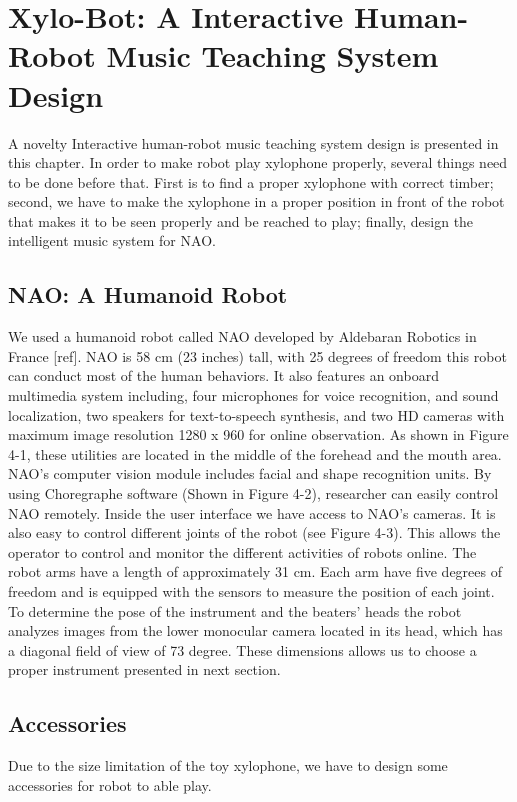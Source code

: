 \chapter{Xylo-Bot: A Interactive Human-Robot Music Teaching System Design} 
A novelty Interactive human-robot music teaching system design is presented in this chapter. In order to make robot play xylophone properly, several things need to be done before that. First is to find a proper xylophone with correct timber; second, we have to make the xylophone in a proper position in front of the robot that makes it to be seen properly and be reached to play; finally, design the intelligent music system for NAO. 

\section{NAO: A Humanoid Robot}
We used a humanoid  robot called NAO developed by Aldebaran Robotics in France [ref]. NAO is 58 cm (23 inches) tall, with 25 degrees of freedom this robot can conduct most of the human behaviors. It also features an onboard multimedia system including, four microphones for voice recognition, and sound localization, two speakers for text-to-speech synthesis, and two HD cameras with maximum image resolution 1280 x 960 for online observation. As shown in Figure 4-1, these utilities are located in the middle of the forehead and the mouth area. NAO’s computer vision module includes facial and shape recognition units. By using Choregraphe software (Shown  in  Figure 4-2), researcher can easily control NAO remotely. Inside the user interface we have access to NAO’s cameras. It is also easy to control different joints of the robot (see  Figure 4-3). This  allows the operator to control and monitor the different activities of robots online. 
The robot arms have a length of approximately 31 cm. Each arm have five degrees of freedom and is equipped with the sensors to measure the position of each joint. To determine the pose of the instrument and the beaters' heads the robot analyzes images from the lower monocular camera located in its head, which has a diagonal field of view of 73 degree. These dimensions allows us to choose a proper instrument presented in next section.

\section{Accessories}
Due to the size limitation of the toy xylophone, we have to design some accessories for robot to able play.

